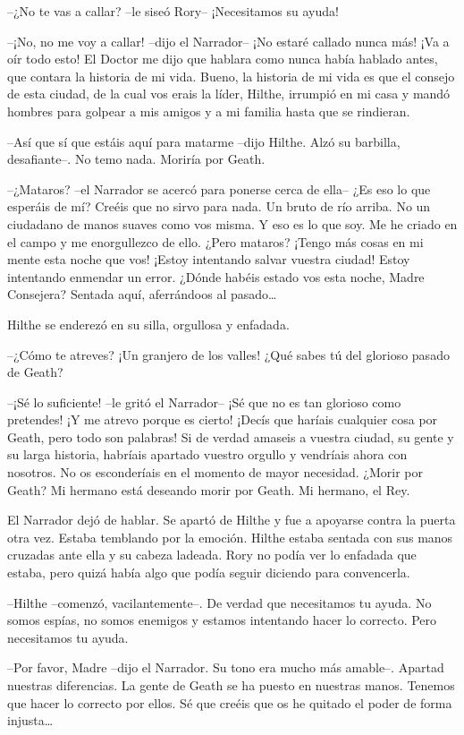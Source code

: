 {--¿No te vas a callar? --le siseó Rory-- ¡Necesitamos su ayuda!}

{--¡No, no me voy a callar! --dijo el Narrador-- ¡No estaré callado
	nunca más! ¡Va a oír todo esto! El Doctor me dijo que hablara como nunca
	había hablado antes, que contara la historia de mi vida. Bueno, la
	historia de mi vida es que el consejo de esta ciudad, de la cual vos
	erais la líder, Hilthe, irrumpió en mi casa y mandó hombres para golpear
a mis amigos y a mi familia hasta que se rindieran.}

{--Así que sí que estáis aquí para matarme --dijo Hilthe. Alzó su
barbilla, desafiante--. No temo nada. Moriría por Geath.}

{--¿Mataros? --el Narrador se acercó para ponerse cerca de ella-- ¿Es
	eso lo que esperáis de mí? Creéis que no sirvo para nada. Un bruto de
	río arriba. No un ciudadano de manos suaves como vos misma. Y eso es lo
	que soy. Me he criado en el campo y me enorgullezco de ello. ¿Pero
	mataros? ¡Tengo más cosas en mi mente esta noche que vos! ¡Estoy
	intentando salvar vuestra ciudad! Estoy intentando enmendar un error.
	¿Dónde habéis estado vos esta noche, Madre Consejera? Sentada aquí,
	aferrándoos al pasado\ldots{}}

{Hilthe se enderezó en su silla, orgullosa y enfadada.}

{--¿Cómo te atreves? ¡Un granjero de los valles! ¿Qué sabes tú del
glorioso pasado de Geath?}

{--¡Sé lo suficiente! --le gritó el Narrador-- ¡Sé que no es tan
	glorioso como pretendes! ¡Y me atrevo porque es cierto! ¡Decís que
	haríais cualquier cosa por Geath, pero todo son palabras! Si de verdad
	amaseis a vuestra ciudad, su gente y su larga historia, habríais
	apartado vuestro orgullo y vendríais ahora con nosotros. No os
	esconderíais en el momento de mayor necesidad. ¿Morir por Geath? Mi
hermano está deseando morir por Geath. Mi hermano, el Rey.}

{El Narrador dejó de hablar. Se apartó de Hilthe y fue a apoyarse contra
	la puerta otra vez. Estaba temblando por la emoción. Hilthe estaba
	sentada con sus manos cruzadas ante ella y su cabeza ladeada. Rory no
	podía ver lo enfadada que estaba, pero quizá había algo que podía seguir
diciendo para convencerla.}

{--Hilthe --comenzó, vacilantemente--. De verdad que necesitamos tu
	ayuda. No somos espías, no somos enemigos y estamos intentando hacer lo
correcto. Pero necesitamos tu ayuda.}

{--Por favor, Madre --dijo el Narrador. Su tono era mucho más
	amable--. Apartad nuestras diferencias. La gente de Geath se ha puesto
	en nuestras manos. Tenemos que hacer lo correcto por ellos. Sé que
	creéis que os he quitado el poder de forma injusta\ldots{}}

